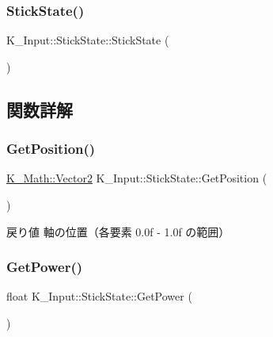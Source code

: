 \subsubsection{\texorpdfstring{Stick\+State()}{StickState()}}
{\footnotesize\ttfamily K\+\_\+\+Input\+::\+Stick\+State\+::\+Stick\+State (\begin{DoxyParamCaption}{ }\end{DoxyParamCaption})}



\subsection{関数詳解}
\mbox{\label{struct_k___input_1_1_stick_state_a05da68756276401e5c044c7bc7731efa}} 
\subsubsection{\texorpdfstring{Get\+Position()}{GetPosition()}}
{\footnotesize\ttfamily \mbox{\hyperlink{namespace_k___math_a41eb0c2c69c938cd59989eb3241cefb2}{K\+\_\+\+Math\+::\+Vector2}} K\+\_\+\+Input\+::\+Stick\+State\+::\+Get\+Position (\begin{DoxyParamCaption}{ }\end{DoxyParamCaption})}

\begin{DoxyReturn}{戻り値}
軸の位置（各要素 0.\+0f -\/ 1.\+0f の範囲） 
\end{DoxyReturn}
\mbox{\label{struct_k___input_1_1_stick_state_a76e98e4459f311a5500f8bfef1c3b5f5}} 
\subsubsection{\texorpdfstring{Get\+Power()}{GetPower()}}
{\footnotesize\ttfamily float K\+\_\+\+Input\+::\+Stick\+State\+::\+Get\+Power (\begin{DoxyParamCaption}{ }\end{DoxyParamCaption})}

